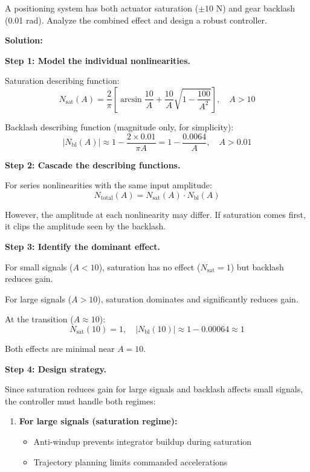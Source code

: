 \begin{example}
\label{ex:combined_nonlinearities}
A positioning system has both actuator saturation ($\pm 10$ N) and gear backlash (0.01 rad). Analyze the combined effect and design a robust controller.

\textbf{Solution:}

\textbf{Step 1: Model the individual nonlinearities.}

Saturation describing function:
\begin{equation}
N_{\text{sat}}(A) = \frac{2}{\pi}\left[\arcsin\frac{10}{A} + \frac{10}{A}\sqrt{1-\frac{100}{A^2}}\right], \quad A > 10
\end{equation}

Backlash describing function (magnitude only, for simplicity):
\begin{equation}
|N_{\text{bl}}(A)| \approx 1 - \frac{2 \times 0.01}{\pi A} = 1 - \frac{0.0064}{A}, \quad A > 0.01
\end{equation}

\textbf{Step 2: Cascade the describing functions.}

For series nonlinearities with the same input amplitude:
\begin{equation}
N_{\text{total}}(A) = N_{\text{sat}}(A) \cdot N_{\text{bl}}(A)
\end{equation}

However, the amplitude at each nonlinearity may differ. If saturation comes first, it clips the amplitude seen by the backlash.

\textbf{Step 3: Identify the dominant effect.}

For small signals ($A < 10$), saturation has no effect ($N_{\text{sat}} = 1$) but backlash reduces gain.

For large signals ($A > 10$), saturation dominates and significantly reduces gain.

At the transition ($A \approx 10$):
\begin{equation}
N_{\text{sat}}(10) = 1, \quad |N_{\text{bl}}(10)| \approx 1 - 0.00064 \approx 1
\end{equation}

Both effects are minimal near $A = 10$.

\textbf{Step 4: Design strategy.}

Since saturation reduces gain for large signals and backlash affects small signals, the controller must handle both regimes:

\begin{enumerate}
    \item \textbf{For large signals (saturation regime):}
    \begin{itemize}
        \item Anti-windup prevents integrator buildup during saturation
        \item Trajectory planning limits commanded accelerations
    \end{itemize}


\end{enumerate}
\end{example}
